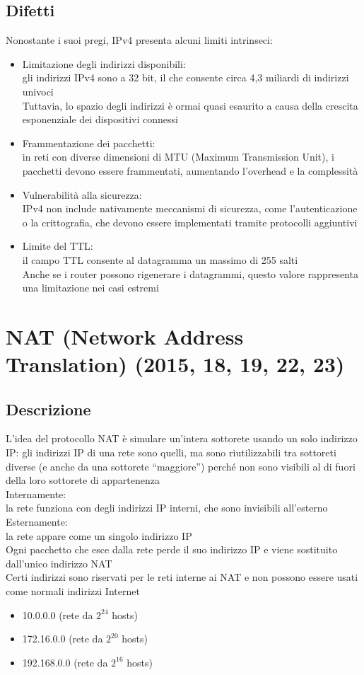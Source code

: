 \documentclass[10pt,oneside,a4paper]{article}
\begin{document}
\subsection{Difetti}
Nonostante i suoi pregi, IPv4 presenta alcuni limiti intrinseci:
\begin{itemize}
\item Limitazione degli indirizzi disponibili:\\
gli indirizzi IPv4 sono a 32 bit, il che consente circa 4,3 miliardi di indirizzi univoci\\
Tuttavia, lo spazio degli indirizzi è ormai quasi esaurito a causa della crescita esponenziale dei dispositivi connessi
\item Frammentazione dei pacchetti:\\
in reti con diverse dimensioni di MTU (Maximum Transmission Unit), i pacchetti devono essere frammentati, aumentando l'overhead e la complessità
\item Vulnerabilità alla sicurezza:\\
IPv4 non include nativamente meccanismi di sicurezza, come l'autenticazione o la crittografia, che devono essere implementati tramite protocolli aggiuntivi
\item Limite del TTL:\\
il campo TTL consente al datagramma un massimo di 255 salti\\
Anche se i router possono rigenerare i datagrammi, questo valore rappresenta una limitazione nei casi estremi
\end{itemize}
\section{NAT (Network Address Translation) (2015, 18, 19, 22, 23)}
\subsection{Descrizione}
L'idea del protocollo NAT è simulare un'intera sottorete usando un solo indirizzo IP: gli indirizzi IP di una rete sono quelli, ma sono riutilizzabili tra sottoreti diverse (e anche da una sottorete “maggiore”) perché non sono visibili al di fuori della loro sottorete di appartenenza\\
Internamente:\\
la rete funziona con degli indirizzi IP interni, che sono invisibili all'esterno\\
Esternamente:\\
la rete appare come un singolo indirizzo IP\\
Ogni pacchetto che esce dalla rete perde il suo indirizzo IP e viene sostituito dall'unico indirizzo NAT\\
Certi indirizzi sono riservati per le reti interne ai NAT e non possono essere usati come normali indirizzi Internet\\
\begin{itemize}
\item 10.0.0.0 (rete da $2^{24}$ hosts)
\item 172.16.0.0 (rete da $2^{20}$ hosts)
\item 192.168.0.0 (rete da $2^{16}$ hosts)
\end{itemize}
\end{document}
